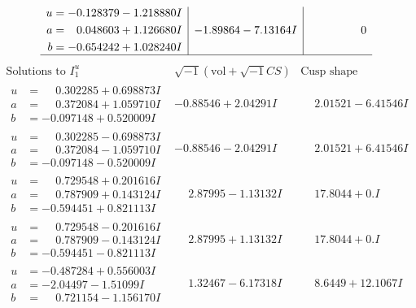 \documentclass[1p]{elsarticle_modified}
\theoremstyle{definition}
\newcommand{\I}{\sqrt{-1}}
\begin{document}
$$\begin{array}{c|c|c}
\begin{aligned}
u &= -0.128379 - 1.218880 I \\
a &= \phantom{-}0.048603 + 1.126680 I \\
b &= -0.654242 + 1.028240 I\end{aligned}
 & -1.89864 - 7.13164 I & \phantom{-0.000000 } 0\\
 \hline 
 \end{array}$$\newpage$$\begin{array}{c|c|c}  
\text{Solutions to }I^u_{1}& \I (\text{vol} + \sqrt{-1}CS) & \text{Cusp shape}\\
 \hline 
\begin{aligned}
u &= \phantom{-}0.302285 + 0.698873 I \\
a &= \phantom{-}0.372084 + 1.059710 I \\
b &= -0.097148 + 0.520009 I\end{aligned}
 & -0.88546 + 2.04291 I & \phantom{-}2.01521 - 6.41546 I \\ \hline\begin{aligned}
u &= \phantom{-}0.302285 - 0.698873 I \\
a &= \phantom{-}0.372084 - 1.059710 I \\
b &= -0.097148 - 0.520009 I\end{aligned}
 & -0.88546 - 2.04291 I & \phantom{-}2.01521 + 6.41546 I \\ \hline\begin{aligned}
u &= \phantom{-}0.729548 + 0.201616 I \\
a &= \phantom{-}0.787909 + 0.143124 I \\
b &= -0.594451 + 0.821113 I\end{aligned}
 & \phantom{-}2.87995 - 1.13132 I & \phantom{-}17.8044 + 0. I\phantom{ +0.000000I} \\ \hline\begin{aligned}
u &= \phantom{-}0.729548 - 0.201616 I \\
a &= \phantom{-}0.787909 - 0.143124 I \\
b &= -0.594451 - 0.821113 I\end{aligned}
 & \phantom{-}2.87995 + 1.13132 I & \phantom{-}17.8044 + 0. I\phantom{ +0.000000I} \\ \hline\begin{aligned}
u &= -0.487284 + 0.556003 I \\
a &= -2.04497 - 1.51099 I \\
b &= \phantom{-}0.721154 - 1.156170 I\end{aligned}
 & \phantom{-}1.32467 - 6.17318 I & \phantom{-}8.6449 + 12.1067 I \\ \hline\begin{aligned}

\end{aligned}
\end{array}$$
\end{document}
